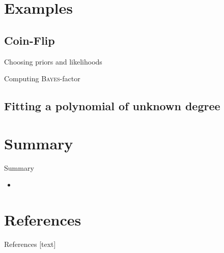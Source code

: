 \documentclass[11pt,aspectratio=1610,dvipsnames]{beamer}
\begin{document}
\section{Examples}

\subsection{Coin-Flip}
\begin{frame}{Choosing priors and likelihoods}
	
\end{frame}

\begin{frame}{Computing \textsc{Bayes}-factor}
	
\end{frame}
\subsection{Fitting a polynomial of unknown degree}

\section{Summary}
\begin{frame}{Summary}
	\begin{tcolorbox}[colback=black!5,colframe=gray!15!black,title=, width=\linewidth]
		\begin{itemize}
			\item 
		\end{itemize}
	\end{tcolorbox}
\end{frame}

\section*{References}
\begin{frame}[allowframebreaks]{References}
	[text]
	
	
\end{frame}
\end{document}
